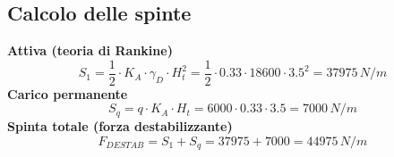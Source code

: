 \subsection{Calcolo delle spinte} 
\textbf{Attiva (teoria di Rankine)}
\begin{equation*}
    S_1 = \frac{1}{2} \cdot K_A \cdot \gamma_D \cdot H^2_t = \frac{1}{2} \cdot 0.33 \cdot 18600 \cdot 3.5^2 = 37975\, N/m
\end{equation*}
\textbf{Carico permanente}
\begin{equation*}
    S_q = q \cdot K_A \cdot H_t = 6000 \cdot 0.33 \cdot 3.5 = 7000 \,N/m
\end{equation*}
\textbf{Spinta totale (forza destabilizzante)}
\begin{equation*}
    F_{DESTAB} = S_1 + S_q = 37975 + 7000 = 44975 \,N/m
\end{equation*}